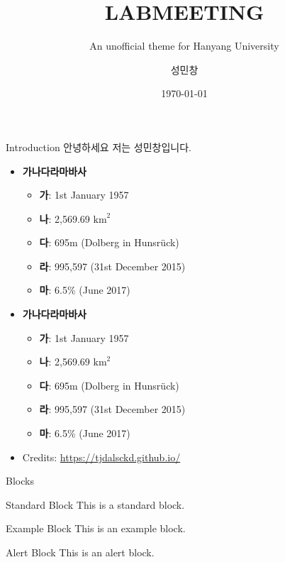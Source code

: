 \documentclass[aspectratio=169]{beamer}
\author{성민창}
\title{\textbf{LABMEETING}}
\subtitle{An unofficial theme for Hanyang University}
\institute{바이오로보틱스 연구실}
\date{\today}
\begin{document}
	\begin{frame}[plain]
		\titlepage
	\end{frame}

	\begin{frame}{Introduction}
	안녕하세요 저는 성민창입니다.
		\begin{itemize}
			\item \textbf{가나다라마바사}
				\begin{itemize}
					\item \textbf{가}: 1st January 1957
					\item \textbf{나}: 2,569.69 $\text{km}^2$
					\item \textbf{다}: 695m (Dolberg in Hunsrück)
					\item \textbf{라}: 995,597 (31st December 2015)
					\item \textbf{마}: 6.5\% (June 2017)
				\end{itemize}
			\item \textbf{가나다라마바사}
				\begin{itemize}
					\item \textbf{가}: 1st January 1957
					\item \textbf{나}: 2,569.69 $\text{km}^2$
					\item \textbf{다}: 695m (Dolberg in Hunsrück)
					\item \textbf{라}: 995,597 (31st December 2015)
					\item \textbf{마}: 6.5\% (June 2017)
				\end{itemize}
			\item Credits: \url{https://tjdalsckd.github.io/}
		\end{itemize}
	\end{frame}

	\begin{frame}{Blocks}
		\begin{block}{Standard Block}
			This is a standard block.
		\end{block}
		
		\begin{exampleblock}{Example Block}
			This is an example block.
		\end{exampleblock}
		
		\begin{alertblock}{Alert Block}
			This is an alert block.
		\end{alertblock}
	\end{frame}
	
\end{document}
